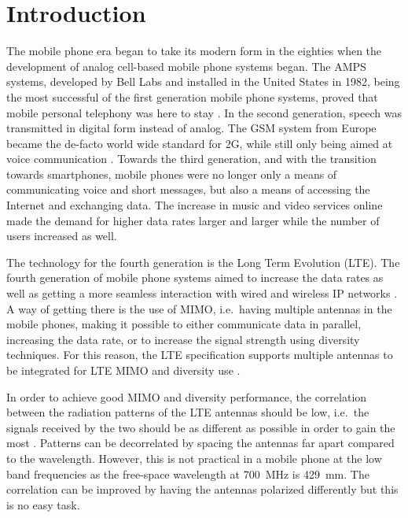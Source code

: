 \chapter*{Introduction}
\label{cha:intro}

The mobile phone era began to take its modern form in the eighties when the development of analog cell-based mobile phone systems began. The AMPS systems, developed by Bell Labs and installed in the United States in 1982, being the most successful of the first generation mobile phone systems, proved that mobile personal telephony was here to stay \cite{tanenbaum2012computer}. In the second generation, speech was transmitted in digital form instead of analog. The GSM system from Europe became the de-facto world wide standard for 2G, while still only being aimed at voice communication \cite{tanenbaum2012computer}. Towards the third generation, and with the transition towards smartphones, mobile phones were no longer only a means of communicating voice and short messages, but also a means of accessing the Internet and exchanging data. The increase in music and video services online made the demand for higher data rates larger and larger while the number of users increased as well.

The technology for the fourth generation is the Long Term Evolution (LTE). The fourth generation of mobile phone systems aimed to increase the data rates as well as getting a more seamless interaction with wired and wireless IP networks \cite{tanenbaum2012computer}. A way of getting there is the use of MIMO, i.e.\ having multiple antennas in the mobile phones, making it possible to either communicate data in parallel, increasing the data rate, or to increase the signal strength using diversity techniques. For this reason, the LTE specification supports multiple antennas to be integrated for LTE MIMO and diversity use \cite{holma2011lte}.

In order to achieve good MIMO and diversity performance, the correlation between the radiation patterns of the LTE antennas should be low, i.e.\ the signals received by the two should be as different as possible in order to gain the most \cite{Tim2012Practical}. Patterns can be decorrelated by spacing the antennas far apart compared to the wavelength. However, this is not practical in a mobile phone at the low band frequencies as the free-space wavelength at \SI{700}{MHz} is \SI{429}{mm}. The correlation can be improved by having the antennas polarized differently but this is no easy task.

